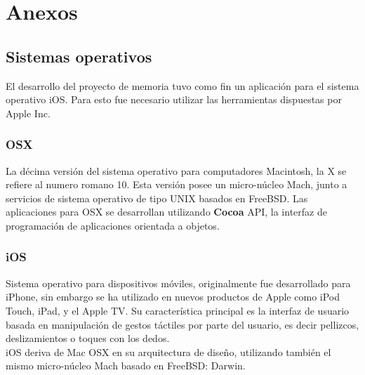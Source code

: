 \chapter{Anexos}
	\section{Sistemas operativos}
	El desarrollo del proyecto de memoria tuvo como fin un aplicación para el sistema operativo iOS. Para esto fue necesario utilizar las herramientas dispuestas por Apple Inc.
		\subsection{OSX}
La décima versión del sistema operativo para computadores Macintosh, la X se refiere al numero romano 10. Esta versión posee un micro-núcleo Mach, junto a servicios de sistema operativo de tipo UNIX basados en FreeBSD.
Las aplicaciones para OSX se desarrollan utilizando \textbf{Cocoa} API, la interfaz de programación de aplicaciones orientada a objetos.

		\subsection{iOS}
Sistema operativo para dispositivos móviles, originalmente fue desarrollado para iPhone, sin embargo se ha utilizado en nuevos productos de Apple como iPod Touch, iPad, y el Apple TV. Su característica principal es la interfaz de usuario basada en manipulación de gestos táctiles por parte del usuario, es decir pellizcos, deslizamientos o toques con los dedos.\\

iOS deriva de Mac OSX en su arquitectura de diseño, utilizando también el mismo micro-núcleo Mach basado en FreeBSD: Darwin.\\

